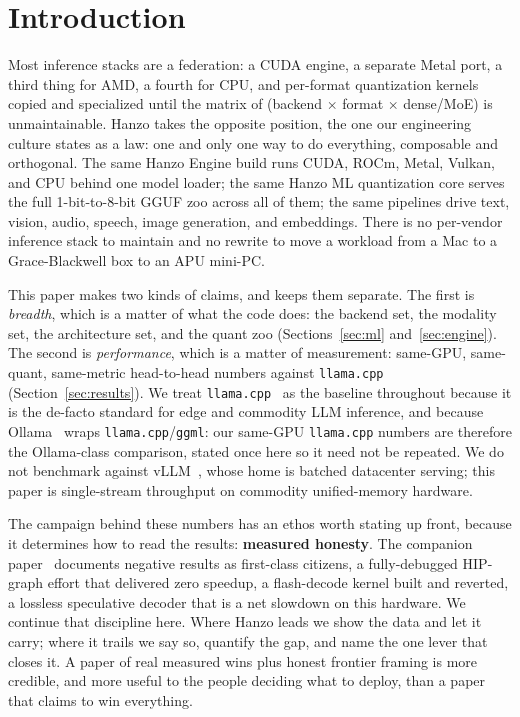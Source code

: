 \documentclass[11pt]{article}
\begin{document}
\section{Introduction}
\label{sec:intro}

Most inference stacks are a federation: a CUDA engine, a separate Metal port, a third thing for
AMD, a fourth for CPU, and per-format quantization kernels copied and specialized until the matrix
of (backend $\times$ format $\times$ dense/MoE) is unmaintainable. Hanzo takes the opposite
position, the one our engineering culture states as a law: one and only one way to do everything,
composable and orthogonal. The same Hanzo Engine build runs CUDA, ROCm, Metal, Vulkan, and CPU
behind one model loader; the same Hanzo ML quantization core serves the full 1-bit-to-8-bit GGUF
zoo across all of them; the same pipelines drive text, vision, audio, speech, image generation, and
embeddings. There is no per-vendor inference stack to maintain and no rewrite to move a workload
from a Mac to a Grace-Blackwell box to an APU mini-PC.

This paper makes two kinds of claims, and keeps them separate. The first is \emph{breadth}, which
is a matter of what the code does: the backend set, the modality set, the architecture set, and the
quant zoo (Sections~\ref{sec:ml} and~\ref{sec:engine}). The second is \emph{performance}, which is
a matter of measurement: same-GPU, same-quant, same-metric head-to-head numbers against
\texttt{llama.cpp} (Section~\ref{sec:results}). We treat \texttt{llama.cpp}~\cite{llamacpp,ggml} as
the baseline throughout because it is the de-facto standard for edge and commodity LLM inference,
and because Ollama~\cite{ollama} wraps \texttt{llama.cpp}/\texttt{ggml}: our same-GPU
\texttt{llama.cpp} numbers are therefore the Ollama-class comparison, stated once here so it need
not be repeated. We do not benchmark against vLLM~\cite{kwon2023}, whose home is batched datacenter
serving; this paper is single-stream throughput on commodity unified-memory hardware.

The campaign behind these numbers has an ethos worth stating up front, because it determines how
to read the results: \textbf{measured honesty}. The companion paper~\cite{hanzorocm} documents
negative results as first-class citizens, a fully-debugged HIP-graph effort that delivered zero
speedup, a flash-decode kernel built and reverted, a lossless speculative decoder that is a net
slowdown on this hardware. We continue that discipline here. Where Hanzo leads we show the data and
let it carry; where it trails we say so, quantify the gap, and name the one lever that closes it.
A paper of real measured wins plus honest frontier framing is more credible, and more useful to
the people deciding what to deploy, than a paper that claims to win everything.
\end{document}
